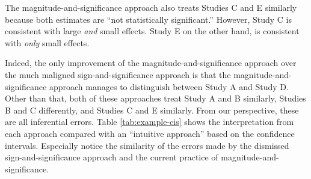 \documentclass[12pt]{article}
\begin{document}
The magnitude-and-significance approach also treats Studies C and E similarly because both estimates are ``not statistically significant.'' However, Study C is consistent with large \emph{and} small effects. Study E on the other hand, is consistent with \emph{only} small effects.

Indeed, the only improvement of the magnitude-and-significance approach over the much maligned sign-and-significance approach is that the magnitude-and-significance approach manages to distinguish between Study A and Study D. Other than that, both of these approaches treat Study A and B similarly, Studies B and C differently, and Studies C and E similarly. From our perspective, these are all inferential errors. Table \ref{tab:example-cis} shows the interpretation from each approach compared with an ``intuitive approach'' based on the confidence intervals. Especially notice the similarity of the errors made by the dismissed sign-and-significance approach and the current practice of magnitude-and-significance.
\end{document}
